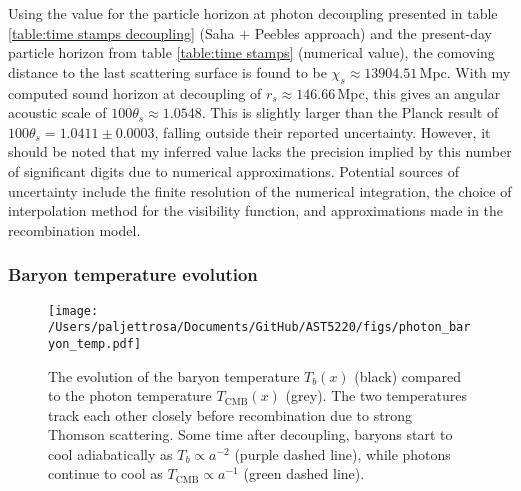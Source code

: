\documentclass{aa}
\numberwithin{equation}{section}
\numberwithin{table}{section}
\numberwithin{figure}{section}
\begin{document}
Using the value for the particle horizon at photon decoupling presented in table \ref{table:time stamps decoupling} (Saha + Peebles approach) and the present-day particle horizon from table \ref{table:time stamps} (numerical value), the comoving distance to the last scattering surface is found to be $\chi_{s} \approx 13904.51\,$Mpc. With my computed sound horizon at decoupling of $r_s \approx 146.66\,$Mpc, this gives an angular acoustic scale of $100\theta_{s} \approx 1.0548$. This is slightly larger than the Planck result of $100\theta_{s} = 1.0411\pm0.0003$, falling outside their reported uncertainty. However, it should be noted that my inferred value lacks the precision implied by this number of significant digits due to numerical approximations. Potential sources of uncertainty include the finite resolution of the numerical integration, the choice of interpolation method for the visibility function, and approximations made in the recombination model.




\subsubsection{Baryon temperature evolution}

\begin{figure}
  \centering
  \texttt{[image: /Users/paljettrosa/Documents/GitHub/AST5220/figs/photon\_baryon\_temp.pdf]}
  \caption{The evolution of the baryon temperature $T_b(x)$ (black) compared to the photon temperature $T_\text{CMB}(x)$ (grey). The two temperatures track each other closely before recombination due to strong Thomson scattering. Some time after decoupling, baryons start to cool adiabatically as $T_b \propto a^{-2}$ (purple dashed line), while photons continue to cool as $T_\text{CMB} \propto a^{-1}$ (green dashed line).}\label{fig:baryon temperature}
\end{figure}
\end{document}
